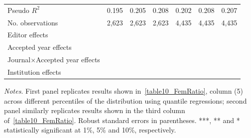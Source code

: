 \begin{table}[H]
\begin{threeparttable}
\begin{tabular}{p{3.78cm}S@{}S@{}S@{}S@{}S@{}S@{}}
            \midrule
            Pseudo \(R^2\)                &       0.195   &       0.205   &       0.208   &       0.202   &       0.208   &       0.207   \\
            No. observations              &       2,623   &       2,623   &       2,623   &       4,435   &       4,435   &       4,435   \\
            \midrule
Editor effects        &           {}   &           {}   &           {}   &           {}   &           {}   &           {}   \\
            Accepted year effects         &           {}   &           {}   &           {}   &               &               &               \\
            Journal\(\times\)Accepted year effects&               &               &               &           {}   &           {}   &           {}   \\
            Institution effects           &           {}   &           {}   &           {}   &           {}   &           {}   &           {}   \\
            \bottomrule
        \end{tabular}
        \begin{tablenotes}
            \tiny
            \item \textit{Notes}. First panel replicates results shown in~\autoref{table10_FemRatio}, column (5) across different percentiles of the distribution using quantile regressions; second panel similarly replicates results shown in the third column of~\autoref{table10_FemRatio}. Robust standard errors in parentheses. ***, ** and * statistically significant at 1\%, 5\% and 10\%, respectively.
        \end{tablenotes}
    \end{threeparttable}
\end{table}